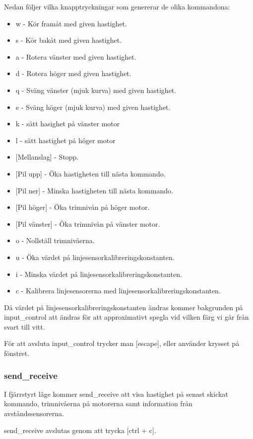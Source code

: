 Nedan följer vilka knapptryckningar som genererar de olika kommandona:

\begin{itemize}
\item w - Kör framåt med given hastighet.
\item s - Kör bakåt med given hastighet.
\item a - Rotera vänster med given hastighet.
\item d - Rotera höger med given hastighet.
\item q - Sväng vänster (mjuk kurva) med given hastighet.
\item e - Sväng höger (mjuk kurva) med given hastighet.
\item k - sätt hasighet på vänster motor
\item l - sätt hastighet på höger motor
\item {[}Mellanslag] - Stopp.

\item {[}Pil upp] - Öka hastigheten till nästa kommando.
\item {[}Pil ner] - Minska hastigheten till nästa kommando.

\item {[}Pil höger] - Öka trimnivån på höger motor.
\item {[}Pil vänster] - Öka trimnivån på vänster motor.
\item o - Nollställ trimnivåerna.

\item u - Öka värdet på linjesensorkalibreringskonstanten.
\item i - Minska värdet på linjesensorkalibreringskonstanten.
\item c - Kalibrera linjesensorerna med linjesensorkalibreringskonstanten.
\end{itemize}

Då värdet på linjesensorkalibreringskonstanten ändras kommer bakgrunden på
input\_control att ändras för att approximativt spegla vid vilken färg vi går
från svart till vitt.

För att avsluta input\_control trycker man [escape], eller använder krysset på
fönstret.

\subsubsection{send\_receive}
I fjärrstyrt läge kommer send\_receive att visa hastighet på senast skickat
kommando, trimnivåerna på motorerna samt information från avståndssensorerna.

send\_receive avslutas genom att trycka [ctrl + c].

